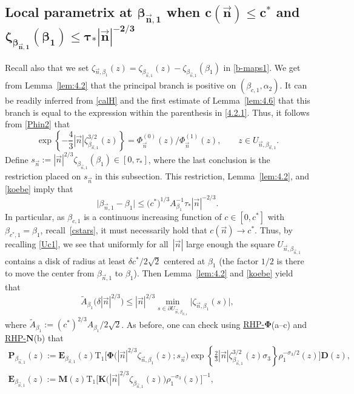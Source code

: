 \documentclass[pdftex]{sigma}
\numberwithin{equation}{section}
\newcommand{\n}{{\vec n}}
\newcommand{\rhn} {\textnormal{RHP}-${\boldsymbol N}$}
\newcommand{\rhphi} {\textnormal{RHP}-${\boldsymbol \Phi}$}
\begin{document}
\subsection[Local parametrix at beta\_n,1 when c(n)leq c\^* and zeta\_beta]{Local parametrix at $ \boldsymbol{\beta_{\n,1} }$ when $ \boldsymbol{c(\n)\leq c^* }$ and $ \boldsymbol{\zeta_{\beta_{\n,1}}(\beta_1) \leq \tau_* |\n|^{-2/3}} $}
\label{ss:64}

Recall also that we set $ \zeta_{\n,\beta_1}(z) = \zeta_{\beta_{\n,1}}(z)-\zeta_{\beta_{\n,1}}(\beta_1) $ in \eqref{b-maps1}. We get from Lemma~\ref{lem:4.2} that the principal branch \smash{$ \zeta_{\beta_{\n,1}}^{3/2}(z) $} is positive on $ (\beta_{c,1},\alpha_2) $. It can be readily inferred from \eqref{calH} and the first estimate of Lemma~\ref{lem:4.6} that this branch is equal to the expression within the parenthesis in \eqref{4.2.1}. Thus, it follows from \eqref{Phin2} that
\begin{equation}
\label{rhphi-4}
\exp\left\{-\frac43|\n|\zeta_{\beta_{\n,1}}^{3/2}(z) \right\} = \Phi_\n^{(0)}(z)/\Phi_\n^{(1)}(z), \qquad z\in U_{\n,\beta_{\n,1}}.
\end{equation}
Define $ s_\n := |\n|^{2/3} \zeta_{\beta_{\n,1}}(\beta_1) \in [0,\tau_*] $, where the last conclusion is the restriction placed on $ s_\n $ in this subsection. This restriction, Lemma~\ref{lem:4.2}, and \eqref{koebe} imply that
\[
\big|\beta_{\n,1} - \beta_1 \big| \leq \bigl( c^*)^{1/3} A_{\beta_1}^{-1} \tau_* |\n|^{-2/3}.
\]
In particular, as $ \beta_{c,1} $ is a continuous increasing function of $ c\in[0,c^*] $ with $ \beta_{c^*,1}=\beta_1 $, recall~\eqref{cstars}, it must necessarily hold that $ c(\n)\to c^* $. Thus, by recalling \eqref{Uc1}, we see that uniformly for all~$ |\n| $ large enough the square $ U_{\n,\beta_{\n,1}} $ contains a disk of radius at least $ \delta c^*/2\sqrt 2 $ centered at $ \beta_1 $ (the factor $ 1/2 $ is there to move the center from $ \beta_{\n,1} $ to $ \beta_1 $). Then Lemma~\ref{lem:4.2} and \eqref{koebe} yield that
\begin{equation}
\label{rhphi-6}
\tilde A_{\beta_1} \bigl( \delta |\n|^{2/3} \bigr) \leq |\n|^{2/3} \min_{s\in\partial U_{\n,\beta_{\n,1}}} \big|\zeta_{\n,\beta_1}(s)\big|,
\end{equation}
where $ \tilde A_{\beta_1} := (c^*)^{2/3}A_{\beta_1}/2\sqrt 2 $. As before, one can check using \hyperref[rhphi]{\rhphi}(a--c) and \hyperref[rhn]{\rhn}(b) that
\begin{gather}
\boldsymbol P_{\beta_{\n,1}}(z) := \boldsymbol E_{\beta_{\n,1}}(z) \mathrm{T}_1\big[ \boldsymbol\Phi\bigl(|\n|^{2/3} \zeta_{\n,\beta_1}(z);s_\n\bigr) \exp\left\{\frac23|\n|\zeta_{\beta_{\n,1}}^{3/2}(z)\sigma_3 \right\} \rho_1^{-\sigma_3/2}(z) \big] \boldsymbol D(z), \nonumber\\
\boldsymbol E_{\beta_{\n,1}}(z) := \boldsymbol M(z)\mathrm{T}_1\big[ \boldsymbol K \bigl(|\n|^{2/3}\zeta_{\beta_{\n,1}}(z)\bigr) \rho_1^{-\sigma_3}(z)\big]^{-1},\label{rhphi-5}
\end{gather}
\end{document}
